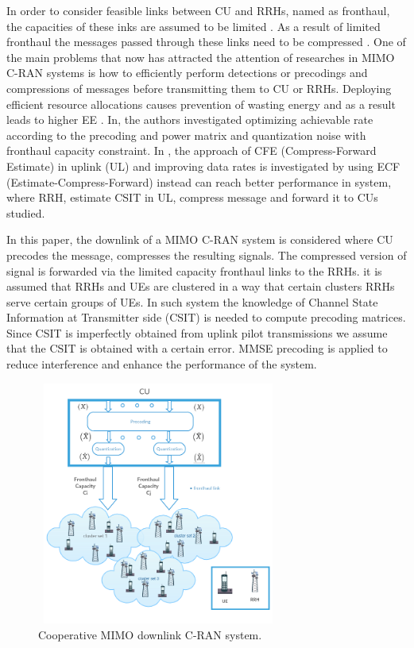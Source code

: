 \documentclass[conference,10pt,twocolumn,letter]{IEEEtran}
\begin{document}
In order to consider feasible links between CU and RRHs, named as fronthaul, the capacities of these inks are assumed to be limited \cite{22,44,1111,66}. As a result of limited fronthaul the messages passed through these links need to be compressed \cite{22,44,1111,66} . One of the main problems that now has attracted the attention of researches in MIMO C-RAN systems is how to efficiently perform detections or precodings and compressions of messages before transmitting them to CU or RRHs. Deploying efficient resource allocations causes prevention of wasting energy and as a result leads to higher EE \cite{33,55,77}. In\cite{22,44,1111,66}, the authors investigated optimizing achievable rate according to the precoding and power matrix and quantization noise with fronthaul capacity constraint. In \cite{66}, the approach of CFE (Compress-Forward Estimate) in uplink (UL) and improving data rates is investigated by using ECF (Estimate-Compress-Forward) instead can reach better performance in system, where RRH, estimate CSIT in UL, compress message and forward it to CUs studied.


In this paper, the downlink of a MIMO C-RAN system is considered where CU precodes the message, compresses the resulting signals. The compressed version of signal is forwarded via the limited capacity fronthaul links to the RRHs. it is assumed that RRHs and UEs are clustered in a way that certain clusters RRHs serve certain groups of UEs. In such system the knowledge of Channel State Information at Transmitter side (CSIT) is needed to compute precoding matrices. Since CSIT is imperfectly obtained from uplink pilot transmissions we assume that the CSIT is obtained with a certain error. MMSE precoding is applied to reduce interference and enhance the performance of the system.

\begin{figure}
  \centering
    \includegraphics[width=8cm, height=8cm]{c1}
  \caption{Cooperative MIMO downlink C-RAN system.}
  \label{fig:c11}
\end{figure}
\end{document}
